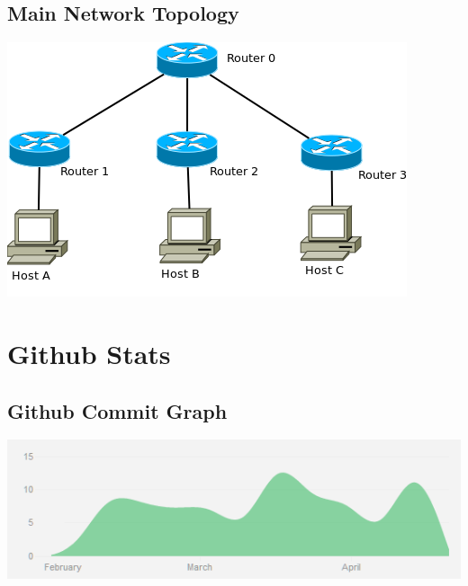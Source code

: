 \section{Main Network Topology}
\begin{center}
	\includegraphics[width=\linewidth]{../Diagrams/Network/MainNetkit.png}
\end{center}

\chapter{Github Stats}
\label{GithubStats}

\section{Github Commit Graph}
\begin{center}
	\includegraphics[width=\linewidth]{../Diagrams/Stats/GitHubCommitGraph.png}
\end{center}

